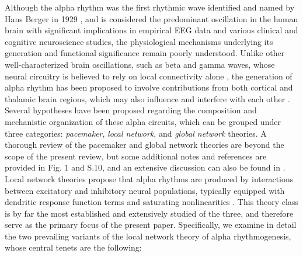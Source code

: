 \documentclass[12pt,twoside]{article}
\begin{document}
Although the alpha rhythm was the first rhythmic wave identified and named by Hans Berger in 1929 \citep{berger1929elektroenkephalogramm, tudor2005hans}, and is considered the predominant oscillation in the human brain \citep{klimesch2012alpha} with significant implications in empirical EEG data and various clinical and cognitive neuroscience studies, the physiological mechanisms underlying its generation and functional significance remain poorly understood.
Unlike other well-characterized brain oscillations, such as beta and gamma waves, whose neural circuitry is believed to rely on local connectivity alone \citep{lozano2018physiological}, the generation of alpha rhythm has been proposed to involve contributions from both cortical and thalamic brain regions, which may also influence and interfere with each other \citep{lozano2018physiological,da1991neural}. Several hypotheses have been proposed regarding the composition and mechanistic organization of these alpha circuits, which can be grouped under three categories: \textit{pacemaker}, \textit{local network}, and \textit{global network} theories. A thorough review of the pacemaker and global network theories are beyond the scope of the present review, but some additional notes and references are provided in Fig. 1 and S.10, and an extensive discussion can also be found in \cite{nunez2006electric}. Local network theories propose that alpha rhythms are produced by interactions between excitatory and inhibitory neural populations, typically equipped with dendritic response function terms and saturating nonlinearities \citep{valdes2010white}. This theory class is by far the most established and extensively studied of the three, and therefore serve as the primary focus of the present paper. Specifically, we examine in detail the two prevailing variants of the local network theory of alpha rhythmogenesis, whose central tenets are the following: 
\end{document}
